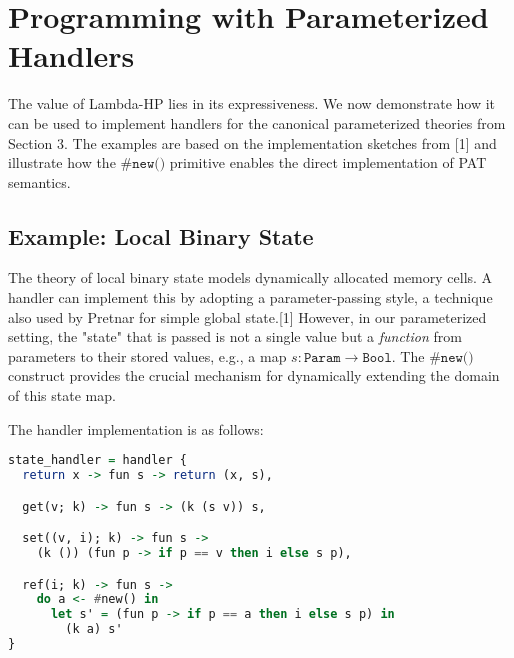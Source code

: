\documentclass{article}
\begin{document}
\section{Programming with Parameterized Handlers}
The value of Lambda-HP lies in its expressiveness. We now demonstrate how it can be used to implement handlers for the canonical parameterized theories from Section 3. The examples are based on the implementation sketches from [1] and illustrate how the $\texttt{\#new()}$ primitive enables the direct implementation of PAT semantics.

\subsection{Example: Local Binary State}
The theory of local binary state models dynamically allocated memory cells. A handler can implement this by adopting a parameter-passing style, a technique also used by Pretnar for simple global state.[1] However, in our parameterized setting, the "state" that is passed is not a single value but a \emph{function} from parameters to their stored values, e.g., a map $s: \texttt{Param} \rightarrow \texttt{Bool}$. The $\texttt{\#new()}$ construct provides the crucial mechanism for dynamically extending the domain of this state map.

The handler implementation is as follows:
\begin{lstlisting}[language=Haskell, basicstyle=\small\ttfamily]
state_handler = handler {
  return x -> fun s -> return (x, s),

  get(v; k) -> fun s -> (k (s v)) s,

  set((v, i); k) -> fun s ->
    (k ()) (fun p -> if p == v then i else s p),

  ref(i; k) -> fun s ->
    do a <- #new() in
      let s' = (fun p -> if p == a then i else s p) in
        (k a) s'
}
\end{lstlisting}
\end{document}
